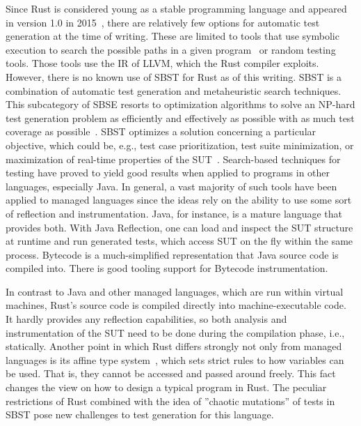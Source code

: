 \documentclass[paper=a4,%
  twoside,%
  BCOR4mm,%
  abstract=true,%
  toc=bibliography,%
  chapterprefix=true,%
  toc=bibliographynumbered,%
  open=right,%
  english,%
  pagesize=pdftex]{scrreprt}
\begin{document}
Since Rust is considered young as a stable programming language and appeared in version 1.0 in 2015~\cite{Rust10}, there are relatively few options for automatic test generation at the time of writing. These are limited to tools that use symbolic execution to search the possible paths in a given program~\cite{cadar2008klee} or random testing tools. Those tools use the \ac{IR} of LLVM, which the Rust compiler exploits. However, there is no known use of \ac{SBST} for Rust as of this writing. \ac{SBST} is a combination of automatic test generation and metaheuristic search techniques. This subcategory of \ac{SBSE} resorts to optimization algorithms to solve an NP-hard test generation problem as efficiently and effectively as possible with as much test coverage as possible~\cite{Khari2019}. \ac{SBST} optimizes a solution concerning a particular objective, which could be, e.g., test case prioritization, test suite minimization, or maximization of real-time properties of the \ac{SUT}~\cite{Khari2019}. Search-based techniques for testing have proved to yield good results when applied to programs in other languages, especially Java. In general, a vast majority of such tools have been applied to managed languages since the ideas rely on the ability to use some sort of reflection and instrumentation. Java, for instance, is a mature language that provides both. With Java Reflection, one can load and inspect the \ac{SUT} structure at runtime and run generated tests, which access \ac{SUT} on the fly within the same process. Bytecode is a much-simplified representation that Java source code is compiled into. There is good tooling support for Bytecode instrumentation.

In contrast to Java and other managed languages, which are run within virtual machines, Rust's source code is compiled directly into machine-executable code. It hardly provides any reflection capabilities, so both analysis and instrumentation of the \ac{SUT} need to be done during the compilation phase, i.e., statically. Another point in which Rust differs strongly not only from managed languages is its affine type system~\cite{Anderson2016}, which sets strict rules to how variables can be used. That is, they cannot be accessed and passed around freely. This fact changes the view on how to design a typical program in Rust. The peculiar restrictions of Rust combined with the idea of ''chaotic mutations'' of tests in SBST pose new challenges to test generation for this language.
\end{document}
